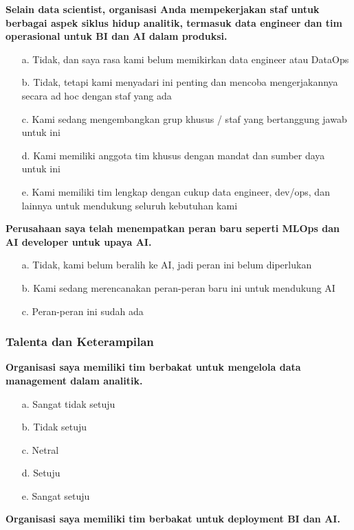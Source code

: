 \documentclass{article}
\begin{document}
\textbf{Selain data scientist, organisasi Anda mempekerjakan staf untuk berbagai aspek siklus hidup analitik, termasuk data engineer dan tim operasional untuk BI dan AI dalam produksi.}

\begin{enumerate}
	\item[a.] Tidak, dan saya rasa kami belum memikirkan data engineer atau DataOps
	\item[b.] Tidak, tetapi kami menyadari ini penting dan mencoba mengerjakannya secara ad hoc dengan staf yang ada
	\item[c.] Kami sedang mengembangkan grup khusus / staf yang bertanggung jawab untuk ini
	\item[d.] Kami memiliki anggota tim khusus dengan mandat dan sumber daya untuk ini
	\item[e.] Kami memiliki tim lengkap dengan cukup data engineer, dev/ops, dan lainnya untuk mendukung seluruh kebutuhan kami
\end{enumerate}

\textbf{Perusahaan saya telah menempatkan peran baru seperti MLOps dan AI developer untuk upaya AI.}

\begin{enumerate}
	\item[a.] Tidak, kami belum beralih ke AI, jadi peran ini belum diperlukan
	\item[b.] Kami sedang merencanakan peran-peran baru ini untuk mendukung AI
	\item[c.] Peran-peran ini sudah ada
\end{enumerate}

\subsubsection{Talenta dan Keterampilan}

\textbf{Organisasi saya memiliki tim berbakat untuk mengelola data management dalam analitik.}

\begin{enumerate}
	\item[a.] Sangat tidak setuju
	\item[b.] Tidak setuju
	\item[c.] Netral
	\item[d.] Setuju
	\item[e.] Sangat setuju
\end{enumerate}

\textbf{Organisasi saya memiliki tim berbakat untuk deployment BI dan AI.}
\end{document}
